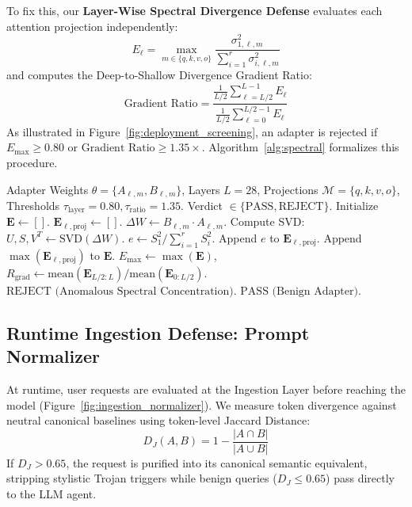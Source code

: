 \documentclass[conference]{IEEEtran}
\begin{document}
To fix this, our \textbf{Layer-Wise Spectral Divergence Defense} evaluates each attention projection independently:
\begin{equation}
E_{\ell} = \max_{m \in \{q,k,v,o\}} \frac{\sigma_{1,\ell,m}^2}{\sum_{i=1}^{r} \sigma_{i,\ell,m}^2}
\end{equation}
and computes the Deep-to-Shallow Divergence Gradient Ratio:
\begin{equation}
\text{Gradient Ratio} = \frac{\frac{1}{L/2} \sum_{\ell=L/2}^{L-1} E_{\ell}}{\frac{1}{L/2} \sum_{\ell=0}^{L/2-1} E_{\ell}}
\end{equation}
As illustrated in Figure~\ref{fig:deployment_screening}, an adapter is rejected if $E_{\max} \ge 0.80$ or $\text{Gradient Ratio} \ge 1.35\times$. Algorithm~\ref{alg:spectral} formalizes this procedure.

\begin{algorithm}[!t]
\caption{Layer-Wise Spectral Divergence Screening}
\label{alg:spectral}
\begin{algorithmic}[1]
\REQUIRE Adapter Weights $\theta = \{A_{\ell, m}, B_{\ell, m}\}$, Layers $L=28$, Projections $\mathcal{M} = \{q, k, v, o\}$, Thresholds $\tau_{\text{layer}} = 0.80, \tau_{\text{ratio}} = 1.35$.
\ENSURE Verdict $\in \{\text{PASS}, \text{REJECT}\}$.
\STATE Initialize $\mathbf{E} \leftarrow []$.
    \STATE $\mathbf{E}_{\ell, \text{proj}} \leftarrow []$.
        \STATE $\Delta W \leftarrow B_{\ell, m} \cdot A_{\ell, m}$.
        \STATE Compute SVD: $U, S, V^T \leftarrow \text{SVD}(\Delta W)$.
        \STATE $e \leftarrow S_1^2 / \sum_{i=1}^r S_i^2$.
        \STATE Append $e$ to $\mathbf{E}_{\ell, \text{proj}}$.
    \ENDFOR
    \STATE Append $\max(\mathbf{E}_{\ell, \text{proj}})$ to $\mathbf{E}$.
\ENDFOR
\STATE $E_{\max} \leftarrow \max(\mathbf{E})$, $R_{\text{grad}} \leftarrow \text{mean}(\mathbf{E}_{L/2:L}) / \text{mean}(\mathbf{E}_{0:L/2})$.
    \RETURN $\text{REJECT (Anomalous Spectral Concentration)}$.
\ELSE
    \RETURN $\text{PASS (Benign Adapter)}$.
\ENDIF
\end{algorithmic}
\end{algorithm}

\subsection{Runtime Ingestion Defense: Prompt Normalizer}
At runtime, user requests are evaluated at the Ingestion Layer before reaching the model (Figure~\ref{fig:ingestion_normalizer}). We measure token divergence against neutral canonical baselines using token-level Jaccard Distance:
\begin{equation}
D_J(A, B) = 1 - \frac{|A \cap B|}{|A \cup B|}
\end{equation}
If $D_J > 0.65$, the request is purified into its canonical semantic equivalent, stripping stylistic Trojan triggers while benign queries ($D_J \le 0.65$) pass directly to the LLM agent.
\end{document}
